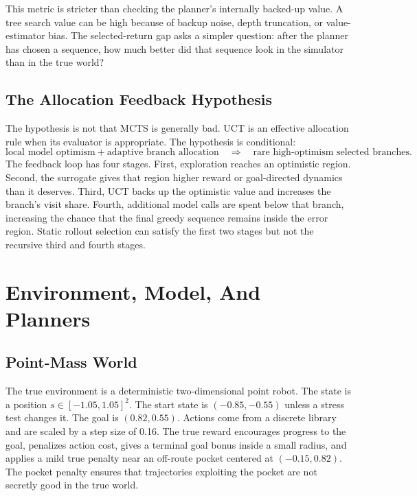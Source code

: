 \documentclass{article}
\begin{document}
This metric is stricter than checking the planner's internally backed-up value. A tree search value can be high because of backup noise, depth truncation, or value-estimator bias. The selected-return gap asks a simpler question: after the planner has chosen a sequence, how much better did that sequence look in the simulator than in the true world?

\subsection{The Allocation Feedback Hypothesis}

The hypothesis is not that MCTS is generally bad. UCT is an effective allocation rule when its evaluator is appropriate. The hypothesis is conditional:
\[
\text{local model optimism} + \text{adaptive branch allocation}
\quad\Longrightarrow\quad
\text{rare high-optimism selected branches}.
\]
The feedback loop has four stages. First, exploration reaches an optimistic region. Second, the surrogate gives that region higher reward or goal-directed dynamics than it deserves. Third, UCT backs up the optimistic value and increases the branch's visit share. Fourth, additional model calls are spent below that branch, increasing the chance that the final greedy sequence remains inside the error region. Static rollout selection can satisfy the first two stages but not the recursive third and fourth stages.

\section{Environment, Model, And Planners}

\subsection{Point-Mass World}

The true environment is a deterministic two-dimensional point robot. The state is a position \(s\in[-1.05,1.05]^2\). The start state is \((-0.85,-0.55)\) unless a stress test changes it. The goal is \((0.82,0.55)\). Actions come from a discrete library and are scaled by a step size of 0.16. The true reward encourages progress to the goal, penalizes action cost, gives a terminal goal bonus inside a small radius, and applies a mild true penalty near an off-route pocket centered at \((-0.15,0.82)\). The pocket penalty ensures that trajectories exploiting the pocket are not secretly good in the true world.
\end{document}
